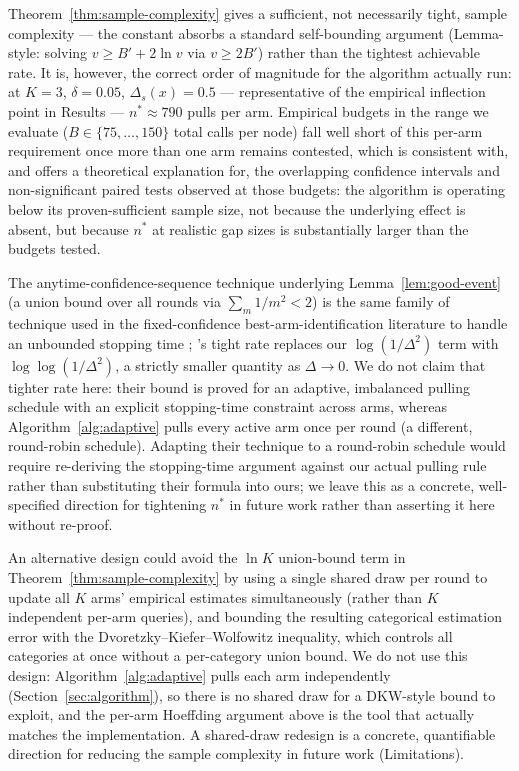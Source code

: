 \begin{remark}
\label{rem:not-tight}
Theorem~\ref{thm:sample-complexity} gives a sufficient, not necessarily tight, sample complexity — the constant absorbs a standard self-bounding argument (Lemma-style: solving $v \geq B' + 2\ln v$ via $v \geq 2B'$) rather than the tightest achievable rate. It is, however, the correct order of magnitude for the algorithm actually run: at $K{=}3$, $\delta{=}0.05$, $\Delta_s(x){=}0.5$ — representative of the empirical inflection point in Results — $n^* \approx 790$ pulls per arm. Empirical budgets in the range we evaluate ($B \in \{75,\dots,150\}$ total calls per node) fall well short of this per-arm requirement once more than one arm remains contested, which is consistent with, and offers a theoretical explanation for, the overlapping confidence intervals and non-significant paired tests observed at those budgets: the algorithm is operating below its proven-sufficient sample size, not because the underlying effect is absent, but because $n^*$ at realistic gap sizes is substantially larger than the budgets tested.

The anytime-confidence-sequence technique underlying Lemma~\ref{lem:good-event} (a union bound over all rounds via $\sum_m 1/m^2 < 2$) is the same family of technique used in the fixed-confidence best-arm-identification literature to handle an unbounded stopping time \citep{jamieson2014lilucb}; \citet{jamieson2014lilucb}'s tight rate replaces our $\log(1/\Delta^2)$ term with $\log\log(1/\Delta^2)$, a strictly smaller quantity as $\Delta \to 0$. We do not claim that tighter rate here: their bound is proved for an adaptive, imbalanced pulling schedule with an explicit stopping-time constraint across arms, whereas Algorithm~\ref{alg:adaptive} pulls every active arm once per round (a different, round-robin schedule). Adapting their technique to a round-robin schedule would require re-deriving the stopping-time argument against our actual pulling rule rather than substituting their formula into ours; we leave this as a concrete, well-specified direction for tightening $n^*$ in future work rather than asserting it here without re-proof.
\end{remark}

\begin{remark}
\label{rem:not-dkw}
An alternative design could avoid the $\ln K$ union-bound term in Theorem~\ref{thm:sample-complexity} by using a single shared draw per round to update all $K$ arms' empirical estimates simultaneously (rather than $K$ independent per-arm queries), and bounding the resulting categorical estimation error with the Dvoretzky–Kiefer–Wolfowitz inequality, which controls all categories at once without a per-category union bound. We do not use this design: Algorithm~\ref{alg:adaptive} pulls each arm independently (Section~\ref{sec:algorithm}), so there is no shared draw for a DKW-style bound to exploit, and the per-arm Hoeffding argument above is the tool that actually matches the implementation. A shared-draw redesign is a concrete, quantifiable direction for reducing the sample complexity in future work (Limitations).
\end{remark}

